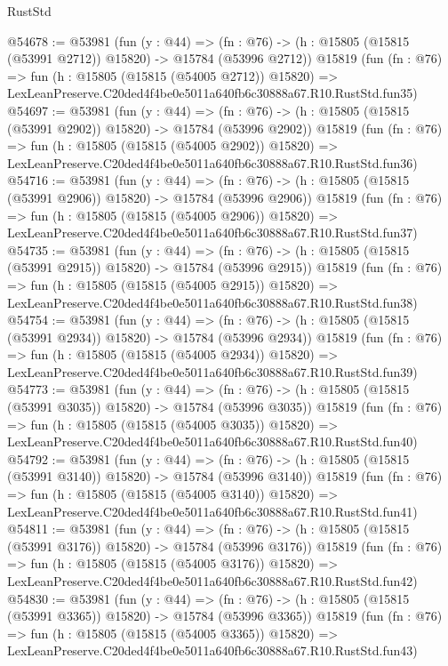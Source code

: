 \begin{lexlean}{RustStd}
\begin{coremodule}
@54678 := @53981
    (fun (y : @44) =>
    (fn : @76) -> (h : @15805 (@15815 (@53991 @2712)) @15820) -> @15784 (@53996 @2712))
    @15819
    (fun (fn : @76) =>
    fun (h : @15805 (@15815 (@54005 @2712)) @15820) =>
    LexLeanPreserve.C20ded4f4be0e5011a640fb6c30888a67.R10.RustStd.fun35)
@54697 := @53981
    (fun (y : @44) =>
    (fn : @76) -> (h : @15805 (@15815 (@53991 @2902)) @15820) -> @15784 (@53996 @2902))
    @15819
    (fun (fn : @76) =>
    fun (h : @15805 (@15815 (@54005 @2902)) @15820) =>
    LexLeanPreserve.C20ded4f4be0e5011a640fb6c30888a67.R10.RustStd.fun36)
@54716 := @53981
    (fun (y : @44) =>
    (fn : @76) -> (h : @15805 (@15815 (@53991 @2906)) @15820) -> @15784 (@53996 @2906))
    @15819
    (fun (fn : @76) =>
    fun (h : @15805 (@15815 (@54005 @2906)) @15820) =>
    LexLeanPreserve.C20ded4f4be0e5011a640fb6c30888a67.R10.RustStd.fun37)
@54735 := @53981
    (fun (y : @44) =>
    (fn : @76) -> (h : @15805 (@15815 (@53991 @2915)) @15820) -> @15784 (@53996 @2915))
    @15819
    (fun (fn : @76) =>
    fun (h : @15805 (@15815 (@54005 @2915)) @15820) =>
    LexLeanPreserve.C20ded4f4be0e5011a640fb6c30888a67.R10.RustStd.fun38)
@54754 := @53981
    (fun (y : @44) =>
    (fn : @76) -> (h : @15805 (@15815 (@53991 @2934)) @15820) -> @15784 (@53996 @2934))
    @15819
    (fun (fn : @76) =>
    fun (h : @15805 (@15815 (@54005 @2934)) @15820) =>
    LexLeanPreserve.C20ded4f4be0e5011a640fb6c30888a67.R10.RustStd.fun39)
@54773 := @53981
    (fun (y : @44) =>
    (fn : @76) -> (h : @15805 (@15815 (@53991 @3035)) @15820) -> @15784 (@53996 @3035))
    @15819
    (fun (fn : @76) =>
    fun (h : @15805 (@15815 (@54005 @3035)) @15820) =>
    LexLeanPreserve.C20ded4f4be0e5011a640fb6c30888a67.R10.RustStd.fun40)
@54792 := @53981
    (fun (y : @44) =>
    (fn : @76) -> (h : @15805 (@15815 (@53991 @3140)) @15820) -> @15784 (@53996 @3140))
    @15819
    (fun (fn : @76) =>
    fun (h : @15805 (@15815 (@54005 @3140)) @15820) =>
    LexLeanPreserve.C20ded4f4be0e5011a640fb6c30888a67.R10.RustStd.fun41)
@54811 := @53981
    (fun (y : @44) =>
    (fn : @76) -> (h : @15805 (@15815 (@53991 @3176)) @15820) -> @15784 (@53996 @3176))
    @15819
    (fun (fn : @76) =>
    fun (h : @15805 (@15815 (@54005 @3176)) @15820) =>
    LexLeanPreserve.C20ded4f4be0e5011a640fb6c30888a67.R10.RustStd.fun42)
@54830 := @53981
    (fun (y : @44) =>
    (fn : @76) -> (h : @15805 (@15815 (@53991 @3365)) @15820) -> @15784 (@53996 @3365))
    @15819
    (fun (fn : @76) =>
    fun (h : @15805 (@15815 (@54005 @3365)) @15820) =>
    LexLeanPreserve.C20ded4f4be0e5011a640fb6c30888a67.R10.RustStd.fun43)

\end{coremodule}
\end{lexlean}
